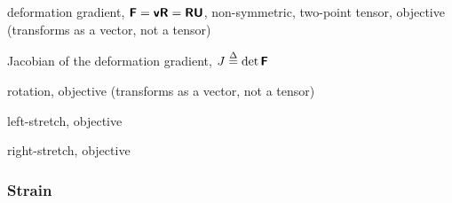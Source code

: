 \begin{description}[noitemsep,align=right,labelwidth=1.5cm,labelsep=0.8cm]
\item [$\tFbold \defe \Grad \vvarphi$] deformation gradient,
$\mbox{\sffamily\bfseries F} = \mbox{\sffamily\bfseries v} \mbox{\sffamily\bfseries R} = \mbox{\sffamily\bfseries R} \mbox{\sffamily\bfseries U}$, non-symmetric, 
two-point tensor, objective (transforms as a vector, not a tensor)
\item [$J$] Jacobian of the deformation gradient, 
$J \stackrel{\Delta}{=} \det \mbox{\sffamily\bfseries F}$
\item 
\item [$\tRbold$] rotation, objective (transforms as a vector, 
not a tensor)
\item [$\tvbold$] left-stretch, objective
\item [$\tUbold$] right-stretch, objective
\end{description}

\subsubsection*{Strain}

